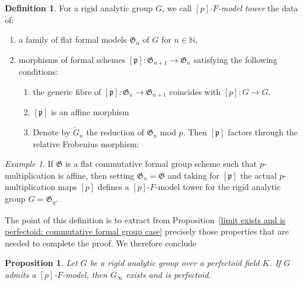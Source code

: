 \documentclass[11pt,oneside]{amsart}
\newtheorem{proposition}[theorem]{Proposition}
\theoremstyle{definition}
\newtheorem{definition}[theorem]{Definition}
\theoremstyle{remark}
\newtheorem*{example}{Example}
\begin{document}
	\begin{definition}
		For a rigid analytic group $G$, we call \textit{$[p]$-$F$-model tower} the data of:
		\begin{enumerate}
			\item a family of flat formal models $\mathfrak G_n$ of $G$ for $n\in \mathbb N$,
			\item morphisms of formal schemes $[\mathfrak p]:\mathfrak G_{n+1}\rightarrow \mathfrak G_{n}$ satisfying the following conditions:
			\begin{enumerate}
				\item the generic fibre of $[\mathfrak p]:\mathfrak G_n\rightarrow \mathfrak G_{n+1}$ coincides with $[p]:G\rightarrow G$. 
				\item $[\mathfrak p]$ is an affine morphism
				\item Denote by $\tilde{G}_n$ the reduction of $\mathfrak G_n$ mod $p$. Then $[\mathfrak p]$ factors through the relative Frobenius morphism:
				\begin{center}
				\end{center}
				
			\end{enumerate}
			
			 
		\end{enumerate}
	\end{definition}
	\begin{example}
		If $\mathfrak G$ is a flat commutative formal group scheme such that $p$-multiplication is affine, then setting $\mathfrak G_n = \mathfrak G$ and taking for $[\mathfrak p]$ the actual $p$-multiplication maps $[p]$ defines a $[p]$-$F$-model tower for the rigid analytic group $G=\mathfrak G_\eta$.
	\end{example}
	The point of this definition is to extract from Proposition~\ref{limit exists and is perfectoid: commutative formal group case} precisely those properties that are needed to complete the proof. We therefore conclude
	\begin{proposition}\label{existence of p-F-model tower implies perfectoid}
		Let $G$ be a rigid analytic group over a perfectoid field $K$. If $G$ admits a $[p]$-$F$-model, then $G_\infty$ exists and is perfectoid.
	\end{proposition}
	
\end{document}
